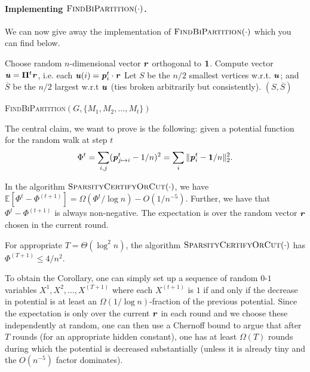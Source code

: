 \paragraph{Implementing $\textsc{FindBiPartition}(\cdot)$.} We can now give away the implementation of $\textsc{FindBiPartition}(\cdot)$ which you can find below.

\begin{algorithm}[H]
    Choose random $n$-dimensional vector $\boldsymbol{\mathit{r}}$ orthogonal to $\boldsymbol{1}$.\;
    Compute vector $\boldsymbol{\mathit{u}} = \boldsymbol{\Pi}^t \boldsymbol{\mathit{r}}$, i.e. each $\boldsymbol{\mathit{u}}(i) = \boldsymbol{\mathit{p}}_i^t \cdot \boldsymbol{\mathit{r}}$\;
    Let $S$ be the $n/2$ smallest vertices w.r.t. $\boldsymbol{\mathit{u}}$; and $\overline{S}$ be the $n/2$ largest w.r.t $\boldsymbol{\mathit{u}}$ (ties broken arbitrarily but consistently).\;
    \Return $(S, \overline{S})$
  \caption{\textsc{FindBiPartition}$(G, \{M_1, M_2, \dots, M_t\})$}
  \label{algo:findBiPartition}
\end{algorithm}

The central claim, we want to prove is the following: given a potential function for the random walk at step $t$
\[
    \Phi^t = \sum_{i,j} (\boldsymbol{\mathit{p}}_{j \mapsto i}^t - 1/n)^2 = \sum_{i} \|\boldsymbol{\mathit{p}}_{i}^t - \boldsymbol{1}/n\|_2^2.
\]
\begin{claim}\label{clm:mainClaimCutMatching}
In the algorithm $\textsc{SparsityCertifyOrCut}(\cdot)$, we have $\mathbb{E}[\Phi^{t} - \Phi^{(t+1)}] = \Omega(\Phi^t / \log n) - O(1/n^{-5})$. Further, we have that $\Phi^{t} - \Phi^{(t+1)}$ is always non-negative. The expectation is over the random vector $\boldsymbol{\mathit{r}}$ chosen in the current round.
\end{claim}

\begin{corollary}\label{cor:fewRoundsCutMathcing}
For appropriate $T = \Theta(\log^2 n)$, the algorithm $\textsc{SparsityCertifyOrCut}(\cdot)$ has $\Phi^{(T+1)} \leq 4/n^2$.
\end{corollary}

To obtain the Corollary, one can simply set up a sequence of random $0$-$1$ variables $X^1, X^2, \ldots, X^{(T+1)}$ where each $X^{(t+1)}$ is $1$ if and only if the decrease in potential is at least an $\Omega(1/\log n)$-fraction of the previous potential. Since the expectation is only over the current $\boldsymbol{\mathit{r}}$ in each round and we choose these independently at random, one can then use a Chernoff bound to argue that after $T$ rounds (for an appropriate hidden constant), one has at least $\Omega(T)$ rounds during which the potential is decreased substantially (unless it is already tiny and the $O(n^{-5})$ factor dominates). 

